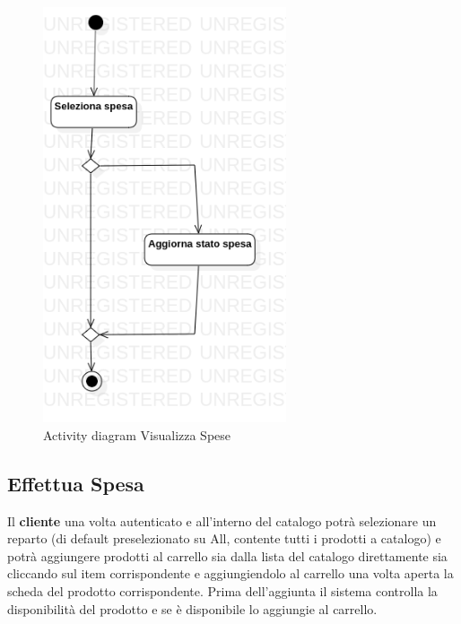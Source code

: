\documentclass[12pt, a4paper]{report}
\begin{document}
\begin{figure}[h]
  \centering
  \includegraphics[width=0.64\textwidth]{Use Case Model!Controllo spese!ActivityControlloSpese!ActivityDiagramControlloSpese_12.png}
  \caption{Activity diagram Visualizza Spese}
\end{figure}

\newpage

\subsection{Effettua Spesa}

Il \textbf{cliente} una volta autenticato e all'interno del catalogo potrà selezionare un reparto (di default preselezionato su All, contente tutti i prodotti a catalogo) e potrà aggiungere prodotti al carrello sia dalla lista del catalogo direttamente sia cliccando sul item corrispondente e aggiungiendolo al carrello una volta aperta la scheda del prodotto corrispondente.
Prima dell'aggiunta il sistema controlla la disponibilità del prodotto e se è disponibile lo aggiungie al carrello.
\end{document}
